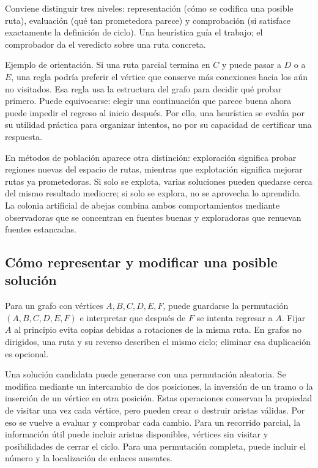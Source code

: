 Conviene distinguir tres niveles: representación (cómo se codifica una posible ruta), evaluación (qué tan prometedora parece) y comprobación (si satisface exactamente la definición de ciclo). Una heurística guía el trabajo; el comprobador da el veredicto sobre una ruta concreta.

Ejemplo de orientación. Si una ruta parcial termina en $C$ y puede pasar a $D$ o a $E$, una regla podría preferir el vértice que conserve más conexiones hacia los aún no visitados. Esa regla usa la estructura del grafo para decidir qué probar primero. Puede equivocarse: elegir una continuación que parece buena ahora puede impedir el regreso al inicio después. Por ello, una heurística se evalúa por su utilidad práctica para organizar intentos, no por su capacidad de certificar una respuesta.

En métodos de población aparece otra distinción: exploración significa probar regiones nuevas del espacio de rutas, mientras que explotación significa mejorar rutas ya prometedoras. Si solo se explota, varias soluciones pueden quedarse cerca del mismo resultado mediocre; si solo se explora, no se aprovecha lo aprendido. La colonia artificial de abejas combina ambos comportamientos mediante observadoras que se concentran en fuentes buenas y exploradoras que renuevan fuentes estancadas.\cite{abc7,abc8}

\subsection{Cómo representar y modificar una posible solución}
Para un grafo con vértices $A,B,C,D,E,F$, puede guardarse la permutación $(A,B,C,D,E,F)$ e interpretar que después de $F$ se intenta regresar a $A$. Fijar $A$ al principio evita copias debidas a rotaciones de la misma ruta. En grafos no dirigidos, una ruta y su reverso describen el mismo ciclo; eliminar esa duplicación es opcional.

Una solución candidata puede generarse con una permutación aleatoria. Se modifica mediante un intercambio de dos posiciones, la inversión de un tramo o la inserción de un vértice en otra posición. Estas operaciones conservan la propiedad de visitar una vez cada vértice, pero pueden crear o destruir aristas válidas. Por eso se vuelve a evaluar y comprobar cada cambio. Para un recorrido parcial, la información útil puede incluir aristas disponibles, vértices sin visitar y posibilidades de cerrar el ciclo. Para una permutación completa, puede incluir el número y la localización de enlaces ausentes.

